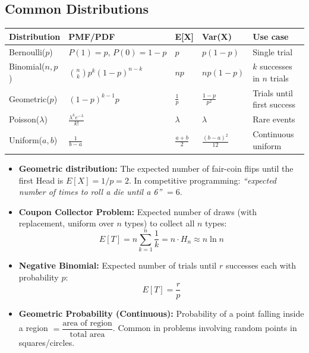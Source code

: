 \subsection{Common Distributions}

\begin{center}
\begin{tabular}{lllll}
\toprule
\textbf{Distribution} & \textbf{PMF/PDF} & \textbf{E[X]} & \textbf{Var(X)} & \textbf{Use case} \\
\midrule
Bernoulli($p$) & $P(1)=p,\,P(0)=1-p$ & $p$ & $p(1-p)$ & Single trial \\
Binomial($n,p$) & $\binom{n}{k}p^k(1-p)^{n-k}$ & $np$ & $np(1-p)$ & $k$ successes in $n$ trials \\
Geometric($p$) & $(1-p)^{k-1}p$ & $\frac{1}{p}$ & $\frac{1-p}{p^2}$ & Trials until first success \\
Poisson($\lambda$) & $\frac{\lambda^k e^{-\lambda}}{k!}$ & $\lambda$ & $\lambda$ & Rare events \\
Uniform($a,b$) & $\frac{1}{b-a}$ & $\frac{a+b}{2}$ & $\frac{(b-a)^2}{12}$ & Continuous uniform \\
\bottomrule
\end{tabular}
\end{center}

\begin{itemize}
    \item \textbf{Geometric distribution:} The expected number of fair-coin flips until the first Head is $E[X] = 1/p = 2$.
          In competitive programming: \textit{``expected number of times to roll a die until a 6''} $= 6$.

    \item \textbf{Coupon Collector Problem:} Expected number of draws (with replacement, uniform over $n$ types) to collect all $n$ types:
          \[ E[T] = n \sum_{k=1}^{n} \frac{1}{k} = n \cdot H_n \approx n \ln n \]

    \item \textbf{Negative Binomial:} Expected number of trials until $r$ successes each with probability $p$:
          \[ E[T] = \frac{r}{p} \]

    \item \textbf{Geometric Probability (Continuous):} Probability of a point falling inside a region $= \dfrac{\text{area of region}}{\text{total area}}$. Common in problems involving random points in squares/circles.
\end{itemize}